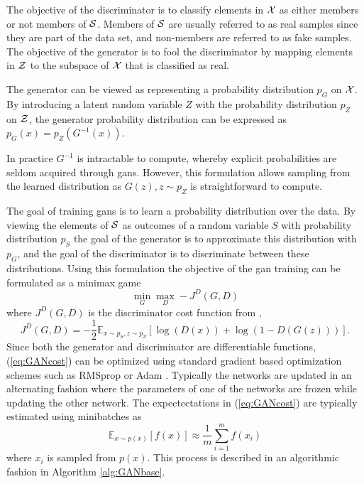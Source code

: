 The objective of the discriminator is to classify elements in $\mathcal{X}$ as either members or not members of $\mathcal{S}$. Members of $\mathcal{S}$ are usually referred to as real samples since they are part of the data set, and non-members are referred to as fake samples. The objective of the generator is to fool the discriminator by mapping elements in $\mathcal{Z}$ to the subspace of $\mathcal{X}$ that is classified as real. 

The generator can be viewed as representing a probability distribution $p_G$ on $\mathcal{X}$. By introducing a latent random variable $Z$ with the probability distribution $p_Z$ on $\mathcal{Z}$, the generator probability distribution can be expressed as $p_G(x) = p_Z(G^{-1}(x))$. 

In practice $G^{-1}$ is intractable to compute, whereby explicit probabilities are seldom acquired through \acrshort{gans}. However, this formulation allows sampling from the learned distribution as $G(z), z \sim p_Z$ is straightforward to compute. 

The goal of training \acrshort{gans} is to learn a probability distribution over the data. By viewing the elements of $\mathcal{S}$ as outcomes of a random variable $S$ with probability distribution $p_S$ the goal of the generator is to approximate this distribution with $p_G$, and the goal of the discriminator is to discriminate between these distributions. Using this formulation the objective of the \acrshort{gan} training can be formulated as a minimax game 
\begin{equation}
    \min_G \max_D -J^{D}(G, D)
\end{equation}
where $J^D(G, D)$ is the discriminator cost function from \parencite{goodfellow2016nips},
\begin{equation}
    J^D(G, D) = -\frac{1}{2}\mathbb{E}_{x \sim p_S, z \sim p_Z}\left[\log(D(x)) + \log(1 - D(G(z))) \right].
    \label{eq:GANcost}
\end{equation}
Since both the generator and discriminator are differentiable functions, (\ref{eq:GANcost}) can be optimized using standard gradient based optimization schemes such as RMSprop \parencite{tieleman2012lecture} or Adam \parencite{kingma2014adam}. Typically the networks are updated in an alternating fashion where the parameters of one of the networks are frozen while updating the other network. The expectectations in (\ref{eq:GANcost}) are typically estimated using minibatches as 
\begin{equation}
    \mathbb{E}_{x\sim p(x)}[f(x)] \approx \frac{1}{m}\sum_{i=1}^mf(x_i)
\end{equation}
where $x_i$ is sampled from $p(x)$. This process is described in an algorithmic fashion in Algorithm \ref{alg:GANbase}.


